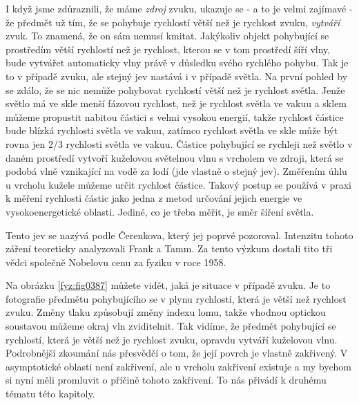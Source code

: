  I když jsme zdůraznili, že máme \emph{zdroj} zvuku, ukazuje se - a to je velmi zajímavé - že 
  předmět už tím, že se pohybuje rychlostí větší než je rychlost zvuku, \emph{vytváří} zvuk. To 
  znamená, že on sám nemusí kmitat. Jakýkoliv objekt pohybující se prostředím větší rychlostí než 
  je rychlost, kterou se v tom prostředí šíří vlny, bude vytvářet automaticky vlny právě v důsledku 
  svého rychlého pohybu. Tak je to v případě zvuku, ale stejný jev nastává i v případě světla. Na 
  první pohled by se zdálo, že se nic nemůže pohybovat rychlostí větší než je rychlost světla. 
  Jenže světlo má ve skle menší fázovou rychlost, než je rychlost světla ve vakuu a sklem můžeme 
  propustit nabitou částici s velmi vysokou energií, takže rychlost částice bude blízká rychlosti 
  světla ve vakuu, zatímco rychlost světla ve skle může být rovna jen 2/3 rychlosti světla ve 
  vakuu. Částice pohybující se rychleji než světlo v daném prostředí vytvoří kuželovou světelnou 
  vlnu s vrcholem ve zdroji, která se podobá vlně vznikající na vodě za lodí (jde vlastně o stejný 
  jev). Změřením úhlu u vrcholu kužele můžeme určit rychlost částice. Takový postup se používá v 
  praxi k měření rychlosti částic jako jedna z metod určování jejich energie ve vysokoenergetické 
  oblasti. Jediné, co je třeba měřit, je směr šíření světla. 
  
  Tento jev se nazývá podle Čerenkova, který jej poprvé pozoroval. Intenzitu tohoto záření 
  teoreticky analyzovali Frank a Tamm. Za tento výzkum dostali tito tři vědci společně Nobelovu 
  cenu za fyziku v roce 1958.
  
  Na obrázku \ref{fyz:fig0387} můžete vidět, jaká je situace v případě zvuku. Je to fotografie 
  předmětu pohybujícího se v plynu rychlostí, která je větší než rychlost zvuku. Změny tlaku 
  způsobují změny indexu lomu, takže vhodnou optickou soustavou můžeme okraj vln zviditelnit. Tak 
  vidíme, že předmět pohybující se rychlostí, která je větší než je rychlost zvuku, opravdu vytváří 
  kuželovou vlnu. Podrobnější zkoumání nás přesvědčí o tom, že její povrch je vlastně zakřivený. V 
  asymptotické oblasti není zakřivení, ale u vrcholu zakřivení existuje a my bychom si nyní měli 
  promluvit o příčině tohoto zakřivení. To nás přivádí k druhému tématu této kapitoly.
  
